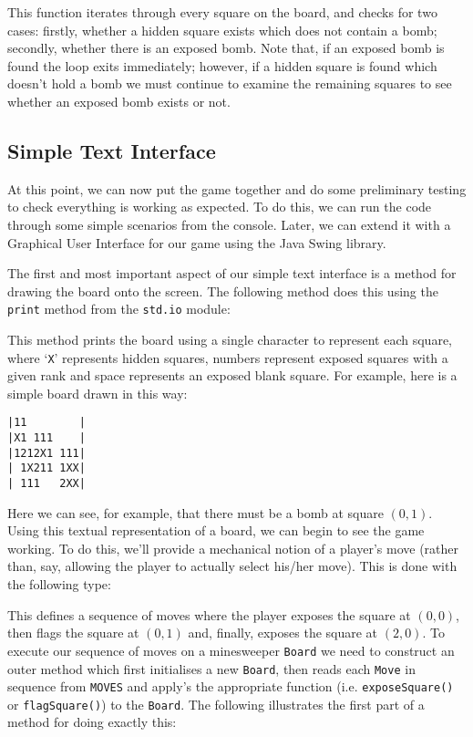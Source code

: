 

This function iterates through every square on the board, and checks for two cases: firstly, whether a hidden square exists which does not contain a bomb; secondly, whether there is an exposed bomb.  Note that, if an exposed bomb is found the loop exits immediately; however, if a hidden square is found which doesn't hold a bomb we must continue to examine the remaining squares to see whether an exposed bomb exists or not.

\subsection{Simple Text Interface}
At this point, we can now put the game together and do some preliminary testing to check everything is working as expected.  To do this, we can run the code through some simple scenarios from the console.  Later, we can extend it with a Graphical User Interface for our game using the Java Swing library. 

The first and most important aspect of our simple text interface is a method for drawing the board onto the screen.  The following method does this using the \lstinline{print} method from the \lstinline{std.io} module:



This method prints the board using a single character to represent each square, where `\verb+X+' represents hidden squares, numbers represent exposed squares with a given rank and space represents an exposed blank square.  For example, here is a simple board drawn in this way:
\begin{lstlisting}
|11        |
|X1 111    |
|1212X1 111|
| 1X211 1XX|
| 111   2XX|
\end{lstlisting}
Here we can see, for example, that there must be a bomb at square $(0,1)$.  Using this textual representation of a board, we can begin to see the game working.  To do this, we'll provide a mechanical notion of a player's move (rather than, say, allowing the player to actually select his/her move).  This is done with the following type:



This defines a sequence of moves where the player exposes the square at $(0,0)$, then flags the square at $(0,1)$ and, finally, exposes the square at $(2,0)$.  To execute our sequence of moves on a minesweeper \lstinline{Board} we need to construct an outer method which first initialises a new \lstinline{Board}, then reads each \lstinline{Move} in sequence from \lstinline{MOVES} and apply's the appropriate function (i.e. \lstinline{exposeSquare()} or \lstinline{flagSquare()}) to the \lstinline{Board}.  The following illustrates the first part of a method for doing exactly this:

